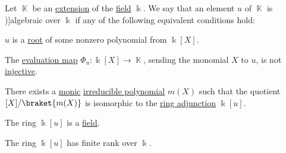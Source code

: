 \begin{definition}\label{def:algebraic_element}
  Let \( \BbbK \) be an \hyperref[def:field/submodel]{extension} of the \hyperref[def:field]{field} \( \Bbbk \). We say that an element \( u \) of \( \BbbK \) is \term[ru=алгебрический (елемент) (\cite[407]{Винберг2014})]{algebraic} over \( \Bbbk \) if any of the following equivalent conditions hold:
  \begin{thmenum}
     \( u \) is a \hyperref[def:polynomial_root]{root} of some nonzero polynomial from \( \Bbbk[X] \).

     The \hyperref[con:substitution_homomorphism]{evaluation map} \( \Phi_u: \Bbbk[X] \to \BbbK \), sending the monomial \( X \) to \( u \), is not \hyperref[def:function_invertibility/injective]{injective}.

     There exists a \hyperref[def:monic_polynomial]{monic} \hyperref[def:domain_divisibility/irreducible]{irreducible polynomial} \( m(X) \) such that the quotient \( \Bbbk[X] / \braket{ m(X) } \) is isomorphic to the \hyperref[def:semiring_adjunction]{ring adjunction} \( \Bbbk[u] \).

     The ring \( \Bbbk[u] \) is a \hyperref[def:field]{field}.

     The ring \( \Bbbk[u] \) has finite rank over \( \Bbbk \).
  \end{thmenum}
\end{definition}
